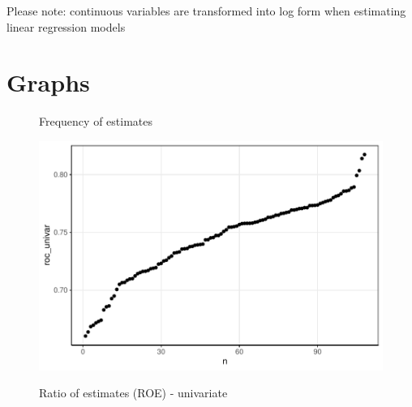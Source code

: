 \documentclass[12pt]{article}
\begin{document}
Please note: continuous variables are transformed into log form when estimating linear regression models 

\clearpage
\section{Graphs}


\begin{figure}[!h]
    \centering
    \caption{Frequency of estimates}
    \label{graph_ctgan_continuous_deciles}
\end{figure}

\begin{figure}[!h]
    \centering
    \caption{Ratio of estimates (ROE) - univariate}
    \includegraphics{../graphs/ctgan/graph_ctgan_roc_univar_raw.pdf}
    \label{graph_ctgan_roc_univar_raw}
\end{figure}
\end{document}
